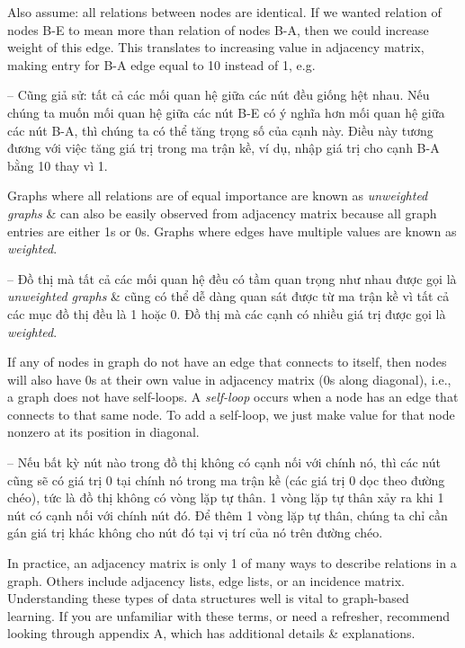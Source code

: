 \documentclass{article}
\begin{document}
\begin{itemize}
\begin{itemize}
\begin{itemize}
            Also assume: all relations between nodes are identical. If we wanted relation of nodes B-E to mean more than relation of nodes B-A, then we could increase weight of this edge. This translates to increasing value in adjacency matrix, making entry for B-A edge equal to 10 instead of 1, e.g.

            -- Cũng giả sử: tất cả các mối quan hệ giữa các nút đều giống hệt nhau. Nếu chúng ta muốn mối quan hệ giữa các nút B-E có ý nghĩa hơn mối quan hệ giữa các nút B-A, thì chúng ta có thể tăng trọng số của cạnh này. Điều này tương đương với việc tăng giá trị trong ma trận kề, ví dụ, nhập giá trị cho cạnh B-A bằng 10 thay vì 1.

            Graphs where all relations are of equal importance are known as {\it unweighted graphs} \& can also be easily observed from adjacency matrix because all graph entries are either 1s or 0s. Graphs where edges have multiple values are known as {\it weighted}.

            -- Đồ thị mà tất cả các mối quan hệ đều có tầm quan trọng như nhau được gọi là {\it unweighted graphs} \& cũng có thể dễ dàng quan sát được từ ma trận kề vì tất cả các mục đồ thị đều là 1 hoặc 0. Đồ thị mà các cạnh có nhiều giá trị được gọi là {\it weighted}.

            If any of nodes in graph do not have an edge that connects to itself, then nodes will also have 0s at their own value in adjacency matrix (0s along diagonal), i.e., a graph does not have self-loops. A {\it self-loop} occurs when a node has an edge that connects to that same node. To add a self-loop, we just make value for that node nonzero at its position in diagonal.

            -- Nếu bất kỳ nút nào trong đồ thị không có cạnh nối với chính nó, thì các nút cũng sẽ có giá trị 0 tại chính nó trong ma trận kề (các giá trị 0 dọc theo đường chéo), tức là đồ thị không có vòng lặp tự thân. 1 vòng lặp tự thân {\it} xảy ra khi 1 nút có cạnh nối với chính nút đó. Để thêm 1 vòng lặp tự thân, chúng ta chỉ cần gán giá trị khác không cho nút đó tại vị trí của nó trên đường chéo.

            In practice, an adjacency matrix is only 1 of many ways to describe relations in a graph. Others include adjacency lists, edge lists, or an incidence matrix. Understanding these types of data structures well is vital to graph-based learning. If you are unfamiliar with these terms, or need a refresher, recommend looking through appendix A, which has additional details \& explanations.


\end{itemize}
\end{itemize}
\end{itemize}
\end{document}

